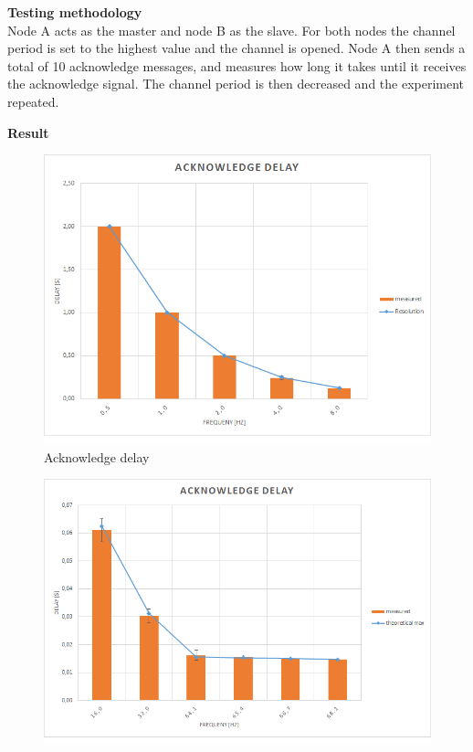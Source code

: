 \begin{description}
	\item{\textbf{Testing methodology}} \hfill \\ Node A acts as the master and node B as the slave. For both nodes the channel period is set to the highest value and the channel is opened. Node A then sends a total of 10 acknowledge messages, and measures how long it takes until it receives the acknowledge signal. The channel period is then decreased and the experiment repeated.
	\item{\textbf{Result}} \hfill \\  
	\begin{figure}[H]
		\centering
		\includegraphics[scale=0.5]{./pics/exp3_norm.png}
		\caption{Acknowledge delay}\label{fig:exp3low}
	\end{figure}
	\begin{figure}[H]
		\centering
		\includegraphics[scale=0.5]{./pics/exp3_detail.png}

\end{figure}
\end{description}
